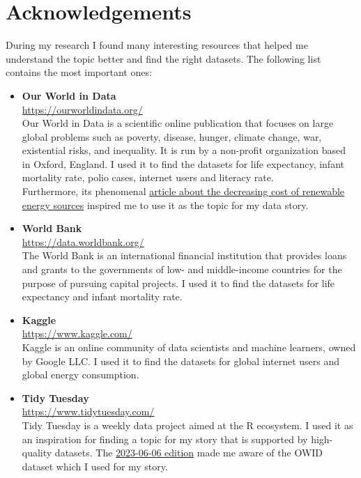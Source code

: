 \documentclass{article}
\begin{document}
\section{Acknowledgements}
During my research I found many interesting resources that helped me understand the topic better and find the right datasets.
The following list contains the most important ones:

\begin{itemize}
    \item \textbf{Our World in Data} \\
    \url{https://ourworldindata.org/} \\
    Our World in Data is a scientific online publication that focuses on large global problems such as poverty, disease, hunger, climate change, war, existential risks, and inequality.
    It is run by a non-profit organization based in Oxford, England.
    I used it to find the datasets for life expectancy, infant mortality rate, polio cases, internet users and literacy rate.\\
    Furthermore, its phenomenal \href{https://ourworldindata.org/cheap-renewables-growth}{article about the decreasing cost of renewable energy sources} inspired me to use it as the topic for my data story.

    \item \textbf{World Bank} \\
    \url{https://data.worldbank.org/} \\
    The World Bank is an international financial institution that provides loans and grants to the governments of low- and middle-income countries for the purpose of pursuing capital projects.
    I used it to find the datasets for life expectancy and infant mortality rate.

    \item \textbf{Kaggle} \\
    \url{https://www.kaggle.com/} \\
    Kaggle is an online community of data scientists and machine learners, owned by Google LLC.
    I used it to find the datasets for global internet users and global energy consumption.

    \item \textbf{Tidy Tuesday} \\
    \url{https://www.tidytuesday.com/} \\
    Tidy Tuesday is a weekly data project aimed at the R ecosystem.
    I used it as an inspiration for finding a topic for my story that is supported by high-quality datasets.
    The \href{https://github.com/rfordatascience/tidytuesday/blob/master/data/2023/2023-06-06/readme.md}{2023-06-06 edition} made me aware of the OWID dataset which I used for my story.


\end{itemize}
\end{document}
